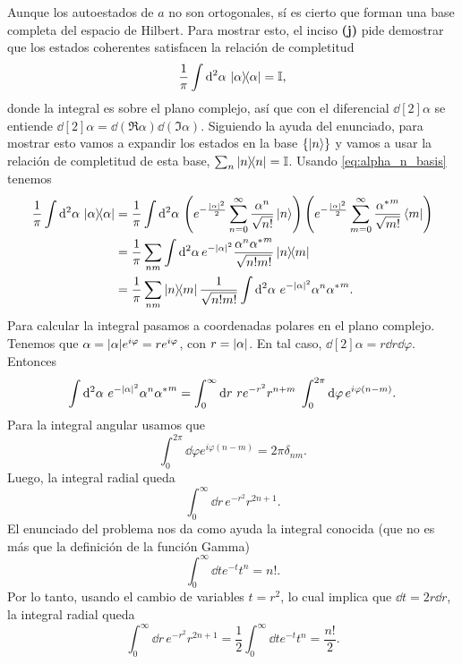\documentclass[10pt, a4paper]{article}
\numberwithin{equation}{subsection}
\begin{document}
Aunque los autoestados de $a$ no son ortogonales, sí es cierto que forman una
base completa del espacio de Hilbert. Para mostrar esto, el inciso \textbf{(j)}
pide demostrar que los estados coherentes satisfacen la relación de completitud
\begin{equation}
  \frac{1}{\pi}\int\dd[2]{\alpha}\,\projector{\alpha} = \Id,
\end{equation}
donde la integral es sobre el plano complejo, así que con el diferencial
$\dd[2]{\alpha}$ se entiende $\dd[2]{\alpha} = \dd(\Re\alpha)\dd(\Im\alpha)$.
Siguiendo la ayuda del enunciado, para mostrar esto vamos a expandir los
estados en la base $\set{\ket{n}}$ y vamos a usar la relación de completitud de
esta base, $\sum_{n}\projector{n} = \Id$. Usando \eqref{eq:alpha_n_basis}
tenemos
\begin{align}
  \frac{1}{\pi}\int\dd[2]{\alpha}\,\projector{\alpha} &= 
    \frac{1}{\pi}\int\dd[2]{\alpha}\,\left( e^{-\frac{\abs{\alpha}^2}{2}}
    \sum_{n=0}^{\infty} \frac{\alpha^n}{\sqrt{n!}} \ket{n} \right)
    \left(e^{-\frac{\abs{\alpha}^2}{2}} \sum_{m=0}^{\infty}
    \frac{\conj{\alpha}^m}{\sqrt{m!}} \bra{m} \right) \nonumber \\
  &= \frac{1}{\pi} \sum_{nm} \int\dd[2]{\alpha} e^{-\abs{\alpha}^2}
    \frac{\alpha^n\conj{\alpha}^m}{\sqrt{n!m!}} \ketbra{n}{m} \nonumber \\
  &= \frac{1}{\pi} \sum_{nm} \ketbra{n}{m} \frac{1}{\sqrt{n!m!}}
    \int\dd[2]{\alpha}\, e^{-\abs{\alpha}^2} \alpha^n\conj{\alpha}^m.
    \label{eq:alpha_complrel_eq1}
\end{align}
Para calcular la integral pasamos a coordenadas polares en el plano complejo.
Tenemos que $\alpha = \abs{\alpha}e^{i\varphi} = re^{i\varphi}$, con $r =
\abs{\alpha}$. En tal caso, $\dd[2]{\alpha} = r\dd{r}\dd{\varphi}$. Entonces
\begin{equation}
  \int\dd[2]{\alpha}\, e^{-\abs{\alpha}^2} \alpha^n{{\alpha}^{*}}^m =
  \int_0^\infty\dd{r}\, re^{-r^2}r^{n+m} \;
  \int_0^{2\pi}\dd{\varphi} e^{i\varphi(n-m)}.
\end{equation}
Para la integral angular usamos que
\begin{equation}
  \int_0^{2\pi}\dd{\varphi} e^{i\varphi(n-m)} = 2\pi\delta_{nm}.
\end{equation}
Luego, la integral radial queda
\begin{equation}
  \int_0^\infty\dd{r}\, e^{-r^2}r^{2n+1}.
\end{equation}
El enunciado del problema nos da como ayuda la integral conocida (que no es más
que la definición de la función Gamma)
\begin{equation}
  \int_0^\infty\dd{t}e^{-t}t^n = n!.
\end{equation}
Por lo tanto, usando el cambio de variables $t = r^2$, lo cual implica que
$\dd{t} = 2r\dd{r}$, la integral radial queda
\begin{equation}
  \int_0^\infty\dd{r}\, e^{-r^2}r^{2n+1} =
  \frac{1}{2}\int_0^\infty\dd{t}e^{-t}t^n = \frac{n!}{2}.
\end{equation}
\end{document}

